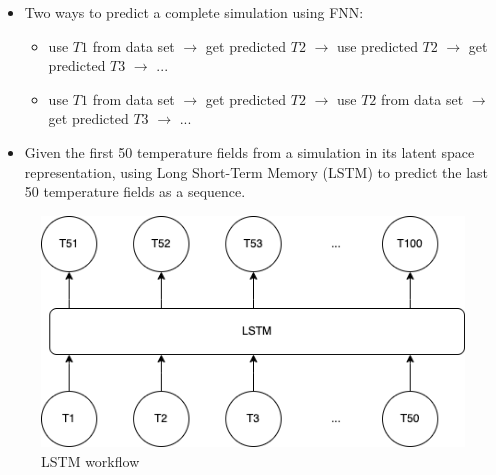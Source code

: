{\begin{itemize} 
    \item Two ways to predict a complete simulation using FNN:

        \begin{itemize}
            \item use $T1$ from data set $\rightarrow$ get predicted $T2$ $\rightarrow$ use predicted $T2$ $\rightarrow$ get predicted $T3$ $\rightarrow$ ...
            
            \item use $T1$ from data set $\rightarrow$ get predicted $T2$ $\rightarrow$ use $T2$ from data set $\rightarrow$ get predicted $T3$ $\rightarrow$ ...
        \end{itemize}

    \item Given the first 50 temperature fields from a simulation in its latent space representation, using Long Short-Term Memory (LSTM) to predict the last 50 temperature fields as a sequence.
     
\end{itemize}

\begin{figure}[H]
    \centering
    \includegraphics[width=0.5\linewidth]{figures/LSTM_workflow.png}
    \caption{LSTM workflow}
\end{figure}
}


